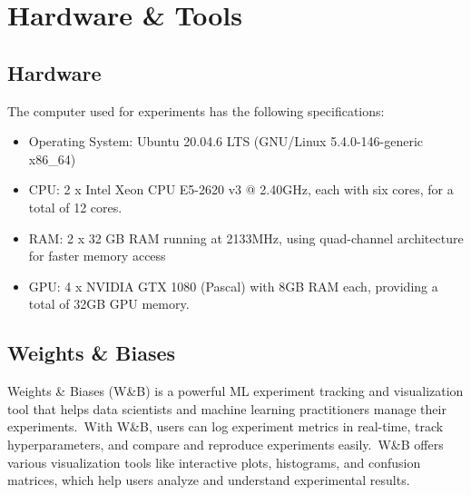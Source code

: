 \documentclass[../xlapes02]{subfiles}
\begin{document}
    \section{Hardware \& Tools}\label{sec:hardware-tools}

    \subsection{Hardware}\label{subsec:hardware}
    The computer used for experiments has the following specifications:
    \begin{itemize}
        \item Operating System: Ubuntu 20.04.6 LTS (GNU/Linux 5.4.0-146-generic x86\_64)
        \item CPU: 2 x Intel Xeon CPU E5-2620 v3 @ 2.40GHz, each with six cores, for a total of 12 cores.
        \item RAM: 2 x 32 GB RAM running at 2133MHz, using quad-channel architecture for faster memory access
        \item GPU: 4 x NVIDIA GTX 1080 (Pascal) with 8GB RAM each, providing a total of 32GB GPU memory.
    \end{itemize}

    \subsection{Weights \& Biases}\label{subsec:wandb}
    Weights \& Biases (W\&B) is a powerful ML experiment tracking and visualization tool that helps data scientists and machine learning practitioners manage their experiments.\ With W\&B, users can log experiment metrics in real-time, track hyperparameters, and compare and reproduce experiments easily.\ W\&B offers various visualization tools like interactive plots, histograms, and confusion matrices, which help users analyze and understand experimental results.
\end{document}
